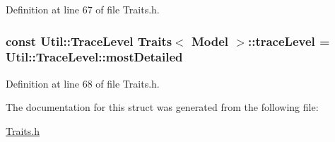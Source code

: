 Definition at line 67 of file Traits.\-h.

\hypertarget{struct_traits_3_01_model_01_4_a2514a0ce35ca8177c4605b4b2266eb05}{
\subsubsection[{trace\-Level}]{\setlength{\rightskip}{0pt plus 5cm}const {\bf Util\-::\-Trace\-Level} {\bf Traits}$<$ {\bf Model} $>$\-::trace\-Level = {\bf Util\-::\-Trace\-Level\-::most\-Detailed}\hspace{0.3cm}{\ttfamily [static]}}}\label{struct_traits_3_01_model_01_4_a2514a0ce35ca8177c4605b4b2266eb05}


Definition at line 68 of file Traits.\-h.



The documentation for this struct was generated from the following file\-:\begin{DoxyCompactItemize}
\item 
\hyperlink{_traits_8h}{Traits.\-h}\end{DoxyCompactItemize}
